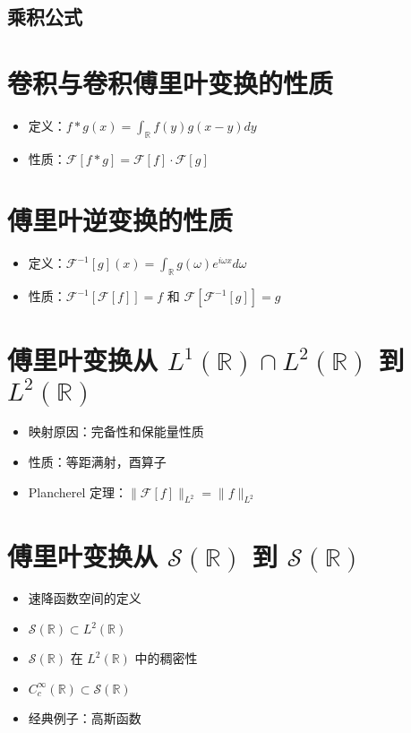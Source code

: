 \documentclass[12pt,a4paper]{article}
\begin{document}
	
	\subsection{乘积公式}

	

	
	\section{卷积与卷积傅里叶变换的性质}
	\begin{itemize}
		\item 定义：\(f * g(x) = \int_{\mathbb{R}} f(y)g(x - y) dy\)
		\item 性质：\(\mathcal{F}[f * g] = \mathcal{F}[f] \cdot \mathcal{F}[g]\)
	\end{itemize}
	
	\section{傅里叶逆变换的性质}
	\begin{itemize}
		\item 定义：\(\mathcal{F}^{-1}[g](x) = \int_{\mathbb{R}} g(\omega) e^{i\omega x} d\omega\)
		\item 性质：\(\mathcal{F}^{-1}[\mathcal{F}[f]] = f\) 和 \(\mathcal{F}[\mathcal{F}^{-1}[g]] = g\)
	\end{itemize}
	
	\section{傅里叶变换从 \(L^1(\mathbb{R}) \cap L^2(\mathbb{R})\) 到 \(L^2(\mathbb{R})\)}
	\begin{itemize}
		\item 映射原因：完备性和保能量性质
		\item 性质：等距满射，酉算子
		\item Plancherel 定理：\(\|\mathcal{F}[f]\|_{L^2} = \|f\|_{L^2}\)
	\end{itemize}
	
	\section{傅里叶变换从 \(\mathcal{S}(\mathbb{R})\) 到 \(\mathcal{S}(\mathbb{R})\)}
	\begin{itemize}
		\item 速降函数空间的定义
		\item \(\mathcal{S}(\mathbb{R}) \subset L^2(\mathbb{R})\)
		\item \(\mathcal{S}(\mathbb{R})\) 在 \(L^2(\mathbb{R})\) 中的稠密性
		\item \(C_c^\infty(\mathbb{R}) \subset \mathcal{S}(\mathbb{R})\)
		\item 经典例子：高斯函数
	\end{itemize}
	
\end{document}
